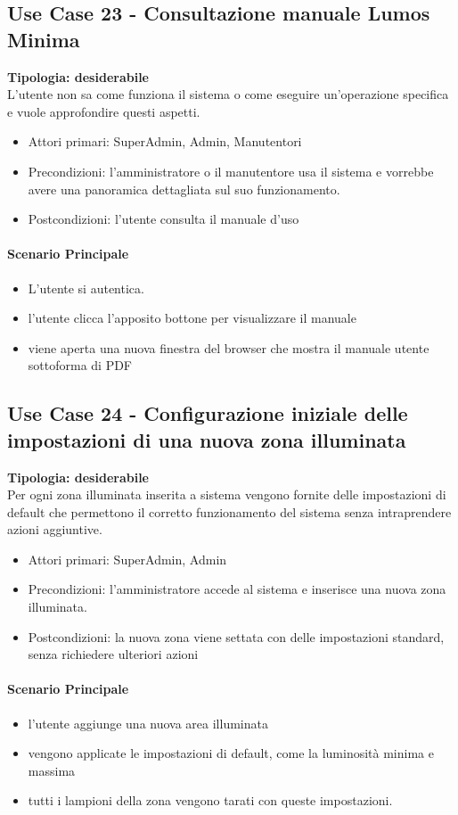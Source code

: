 \documentclass[12pt]{article}
\begin{document}
\subsection{Use Case 23 - Consultazione manuale Lumos Minima}
\textbf{Tipologia: desiderabile}\\
L'utente non sa come funziona il sistema o come eseguire un'operazione specifica e vuole approfondire questi aspetti.
\begin{itemize}
	\item Attori primari: SuperAdmin, Admin, Manutentori
	\item Precondizioni: l'amministratore o il manutentore usa il sistema e vorrebbe avere una panoramica dettagliata sul suo funzionamento.
	\item Postcondizioni: l'utente consulta il manuale d'uso
\end{itemize}
\paragraph{Scenario Principale}
\begin{itemize}
	\item L'utente si autentica.
	\item l'utente clicca l'apposito bottone per visualizzare il manuale
	\item viene aperta una nuova finestra del browser che mostra il manuale utente sottoforma di PDF
\end{itemize}


\subsection{Use Case 24 - Configurazione iniziale delle impostazioni di una nuova zona illuminata}
\textbf{Tipologia: desiderabile} \\
Per ogni zona illuminata inserita a sistema vengono fornite delle impostazioni di default che permettono il corretto funzionamento del sistema senza intraprendere azioni aggiuntive.
\begin{itemize}
	\item Attori primari: SuperAdmin, Admin
	\item Precondizioni: l'amministratore accede al sistema e inserisce una nuova zona illuminata.
	\item Postcondizioni: la nuova zona viene settata con delle impostazioni standard, senza richiedere ulteriori azioni
\end{itemize}
\paragraph{Scenario Principale}
\begin{itemize}
	\item l'utente aggiunge una nuova area illuminata
	\item vengono applicate le impostazioni di default, come la luminosità minima e massima
	\item tutti i lampioni della zona vengono tarati con queste impostazioni.
\end{itemize}
\end{document}
